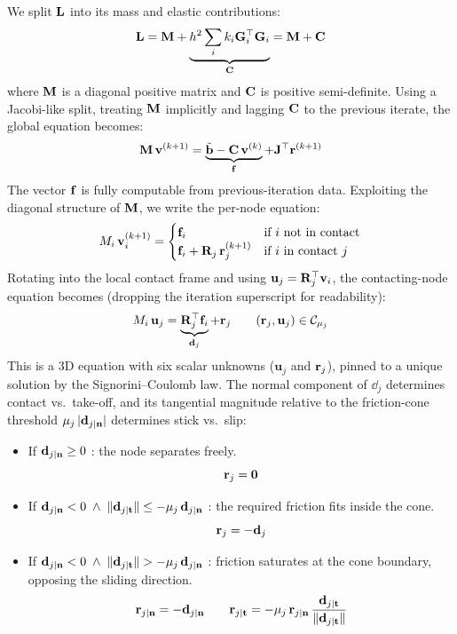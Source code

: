 We split $\mathbf{L}$ into its mass and elastic contributions:
\begin{equation*}
\mathbf{L} = 
\mathbf{M} + 
\underbrace{h^2\sum_i k_i\mathbf{G}_i^\top\mathbf{G}_i}_{\mathbf{C}} = \mathbf{M} + \mathbf{C}
\end{equation*}
where $\mathbf{M}$ is a diagonal positive matrix and $\mathbf{C}$ is positive semi-definite. Using a Jacobi-like split, treating $\mathbf{M}$ implicitly and lagging $\mathbf{C}$ to the previous iterate, the global equation becomes:
\begin{equation}
    \mathbf{M}\,\mathbf{v}^{(k+1)} = 
    \underbrace{\tilde{\mathbf{b}} - \mathbf{C}\,\mathbf{v}^{(k)}}_{\mathbf{f}} + \mathbf{J}^\top\mathbf{r}^{(k+1)}
\end{equation}
The vector $\mathbf{f}$ is fully computable from previous-iteration data. Exploiting the diagonal structure of $\mathbf{M}$, we write the per-node equation:
\begin{equation}
    M_i\,\mathbf{v}_i^{(k+1)} = 
    \begin{cases}
        \mathbf{f}_i &\text{if $i$ not in contact} \\
        \mathbf{f}_i + \mathbf{R}_j\,\mathbf{r}_j^{(k+1)} 
        & \text{if $i$ in contact $j$}
    \end{cases}
\end{equation}
Rotating into the local contact frame and using $\mathbf{u}_j = \mathbf{R}_j^\top\mathbf{v}_i$, the contacting-node equation becomes (dropping the iteration superscript for readability):
\begin{equation}
    M_i\,\mathbf{u}_j = 
    \underbrace{\mathbf{R}_j^\top \mathbf{f}_i}_{\mathbf{d}_j}
    + \mathbf{r}_j 
    \qquad 
    (\mathbf{r}_j, \mathbf{u}_j) \in \mathcal{C}_{\mu_j}
\end{equation}
This is a 3D equation with six scalar unknowns ($\mathbf{u}_j$ and $\mathbf{r}_j$), pinned to a unique solution by the Signorini--Coulomb law. The normal component of $\dd_j$ determines contact vs.\ take-off, and its tangential magnitude relative to the friction-cone threshold $\mu_j\,|\mathbf{d}_{j\mid\mathbf{n}}|$ determines stick vs.\ slip:
\begin{itemize}
\item If $\mathbf{d}_{j\mid \mathbf{n}} \geq 0$\; : the node separates freely.
    \[\mathbf{r}_j = \mathbf{0}\]
\item If $\mathbf{d}_{j\mid \mathbf{n}} < 0\;\wedge\; \|\mathbf{d}_{j\mid\mathbf{t}}\| \leq -\mu_j\,\mathbf{d}_{j\mid \mathbf{n}}$\; : the required friction fits inside the cone.
    \[\mathbf{r}_j = -\mathbf{d}_j\]
\item If $\mathbf{d}_{j\mid \mathbf{n}} < 0\;\wedge\; \|\mathbf{d}_{j\mid\mathbf{t}}\| > -\mu_j\,\mathbf{d}_{j\mid \mathbf{n}}$\; : friction saturates at the cone boundary, opposing the sliding direction.
    \[
    \mathbf{r}_{j\mid\mathbf{n}} = -\mathbf{d}_{j\mid\mathbf{n}}
    \qquad
    \mathbf{r}_{j\mid\mathbf{t}} = -\mu_j\,\mathbf{r}_{j\mid\mathbf{n}}\,\frac{\mathbf{d}_{j\mid\mathbf{t}}}{\|\mathbf{d}_{j\mid\mathbf{t}}\|}
    \]
\end{itemize}

